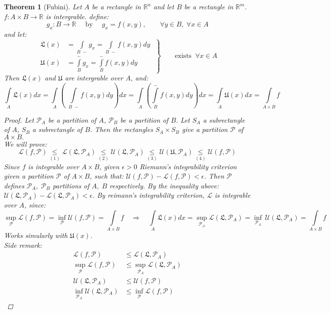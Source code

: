 \documentclass[11pt]{article}
\def\RR{\mathbb{R}}
\newtheorem{theorem}{Theorem}[section]
\begin{document}
\begin{theorem}[Fubini]
Let $A$ be a rectangle in $\RR^n$ and let $B$ be a rectangle in $\RR^m$. $f:A \times B \rightarrow \RR$ is intergrable. define: 
\[ g_x: B \rightarrow \RR \quad  \text{ by } \quad g_x = f(x,y) , \qquad  \forall y \in B,\;  \forall x \in A \]
and let: 
\[ \left.\begin{aligned}
       \mathfrak{L}(x) &=  \int\limits_{B \;-}g_x =\int\limits_{B \;-}f(x,y)dy\\
       \mathfrak{U}(x) &=  \int\limits_{B}^{-}g_x =\int\limits_{B}^{-}f(x,y)dy
       \end{aligned}
 \; \right\}
 \qquad \text{exists} \; \; \forall x \in A\]
Then $\mathfrak{L}(x)$ and $\mathfrak{U}$ are intergrable over $A$, and:
\[\int\limits_{A}\mathfrak{L}(x)dx =\int\limits_{A} \left(\;\int\limits_{B \;-}f(x,y)dy \right)\! dx=\int\limits_{A} \left(\int\limits_{B}^{-}f(x,y)dy \right)\! dx = \int\limits_{A}\mathfrak{U}(x)dx = \int\limits_{A \times B}f\]
\begin{proof}
Let $\mathcal{P}_A$ be a partition of $A$, $\mathcal{P}_B$ be a partition of $B$. Let $S_A$ a subrectangle of $A$,  $S_B$ a subrectangle of $B$. Then the rectangles $S_A \times S_B$ give a partition $\mathcal{P}$ of $A\times B.$ \\
We will prove:
\[\mathcal{L}(f,\mathcal{P}) \underset{(1)}{\leq} \mathcal{L}(\mathfrak{L},\mathcal{P}_A) \underset{(2)}{\leq} \mathcal{U}(\mathfrak{L},\mathcal{P}_A) \underset{(3)}{\leq} \mathcal{U}(\mathfrak{U},\mathcal{P}_A) \underset{(4)}{\leq} \mathcal{U}(f,\mathcal{P})\]
Since $f$ is integrable over $A \times B$, given $\epsilon > 0$ Riemann's integrability criterion given a partition $\mathcal{P}$ of $A \times B$, such that: $\mathcal{U}(f,\mathcal{P}) - \mathcal{L}(f,\mathcal{P}) < \epsilon $. Then $\mathcal{P}$ defines $\mathcal{P}_A ,\; \mathcal{P}_B$ partitions of $A, \; B$ respectively. By the inequality above: $\mathcal{U}(\mathfrak{L},\mathcal{P}_A) - \mathcal{L}(\mathfrak{L},\mathcal{P}_A) < \epsilon $. By reimann's integrability criterion, $\mathcal{L}$ is integrable over $A$, since: 
\[\sup_{\mathcal{P}}\mathcal{L}(f,\mathcal{P})= \inf_{\mathcal{P}}\mathcal{U}(f,\mathcal{P}) = \int\limits_{A\times B}\! \! f \quad \Rightarrow \quad  \int\limits_{A}\mathfrak{L}(x)dx = \sup_{\mathcal{P}_A}\mathcal{L}(\mathfrak{L},\mathcal{P}_A)= \inf_{\mathcal{P}_A}\,\mathcal{U}(\mathfrak{L},\mathcal{P}_A) = \int\limits_{A\times B}\! \!f\]
Works simularly with $\mathfrak{U}(x)$.\\
Side remark:
\begin{align*}
\mathcal{L}(f, \mathcal{P}) &\leq \mathcal{L}(\mathfrak{L}, \mathcal{P}_A)\\
\sup_{\mathcal{P}}\mathcal{L}(f, \mathcal{P}) &\leq \sup_{\mathcal{P}_A}\mathcal{L}(\mathfrak{L}, \mathcal{P}_A)\\
\mathcal{U}(\mathfrak{L}, \mathcal{P}_A) &\leq \mathcal{U}(f, \mathcal{P})\\
\inf_{\mathcal{P}_A}\mathcal{U}(\mathfrak{L}, \mathcal{P}_A) &\leq \inf_{\mathcal{P}}\mathcal{L}(f, \mathcal{P})
\end{align*}


\end{proof}
\end{theorem}
\end{document}
